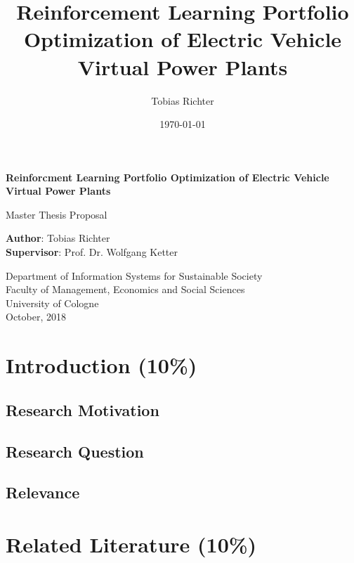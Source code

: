 \documentclass[a4paper]{article}
\author{Tobias Richter}
\date{\today}
\title{Reinforcement Learning Portfolio Optimization of Electric Vehicle Virtual Power Plants}
\begin{document}
\begin{titlepage}
    \begin{center}
        \vspace*{1cm}

        \Large
        \textbf{Reinforcment Learning Portfolio Optimization of Electric Vehicle Virtual Power Plants}

        \vspace{1.5cm}
        Master Thesis Proposal

        \vspace{8.0cm}

        \large
        \textbf{Author}: Tobias Richter\\
        \large
        \textbf{Supervisor}: Prof. Dr. Wolfgang Ketter

        \vspace{1cm}
        \large
        Department of Information Systems for Sustainable Society\\
        Faculty of Management, Economics and Social Sciences\\
        University of Cologne\\

        \vspace{1cm}
        October, 2018

    \end{center}
\end{titlepage}

\tableofcontents
\clearpage
{}

\section{Introduction (10\%)}
\label{sec:orgf858759}
\subsection{Research Motivation}
\label{sec:org63e9780}
\subsection{Research Question}
\label{sec:org9139fc6}
\subsection{Relevance}
\label{sec:orga6257d4}

\section{Related Literature (10\%)}
\label{sec:org047a6bb}
\end{document}
